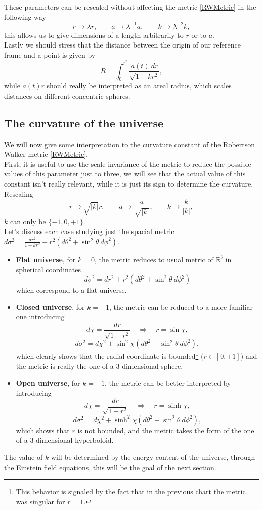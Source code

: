 These parameters can be rescaled without affecting the metric \eqref{RWMetric} in the following way
\begin{equation}
    r\rightarrow\lambda r,\qquad a\rightarrow\lambda^{-1} a,\qquad k\rightarrow\lambda^{-2} k,
\end{equation}
this allows us to give dimensions of a length arbitrarily to $r$ or to $a$.\\
Lastly we should stress that the distance between the origin of our reference frame and a point is given by
\begin{equation}
    R=\int_{0}^{r^*}\frac{a(t)\ dr}{\sqrt{1-kr^2}},
\end{equation}
while $a(t)r$ should really be interpreted as an areal radius, which scales distances on different concentric spheres. 
\subsection{The curvature of the universe}
We will now give some interpretation to the curvature constant of the Robertson Walker metric \eqref{RWMetric}.\\First, it is useful to use the scale invariance of the metric to reduce the possible values of this parameter just to three, we will see that the actual value of this constant isn't really relevant, while it is just its sign to determine the curvature. Rescaling 
\begin{equation}
    r\rightarrow\sqrt{|k|}r,\qquad a\rightarrow\frac{a}{\sqrt{|k|}},\qquad k\rightarrow\frac{k}{|k|},
\end{equation}  
$k$ can only be $\{-1,0,+1\}$. \\
Let's discuss each case studying just the spacial metric $d\sigma^2=\frac{dr^2}{1-kr^2}+r^2(d\theta^2+\sin^2\theta\ d\phi^2)$.
\begin{itemize}
    \item \textbf{Flat universe}, for $k=0$, the metric reduces to usual metric of $\mathbb{R}^3$ in spherical coordinates $$d\sigma^2= dr^2+r^2(d\theta^2+\sin^2\theta\ d\phi^2)$$ which correspond to a flat universe.
    \item \textbf{Closed universe}, for $k=+1$, the metric can be reduced to a more familiar one introducing $$d\chi=\frac{dr}{\sqrt{1-r^2}}\quad\Rightarrow\quad r=\sin\chi,$$$$d\sigma^2=d\chi^2+\sin^2\chi(d\theta^2+\sin^2\theta\ d\phi^2),$$which clearly shows that the radial coordinate is bounded\footnote{This behavior is signaled by the fact that in the previous chart the metric was singular for $r=1$.} ($r\in[0,+1]$) and the metric is really the one of a $3$-dimensional sphere.
    \item \textbf{Open universe}, for $k=-1$, the metric can be better interpreted by introducing$$d\chi=\frac{dr}{\sqrt{1+r^2}}\quad\Rightarrow\quad r=\sinh\chi,$$$$d\sigma^2=d\chi^2+\sinh^2\chi(d\theta^2+\sin^2\theta\ d\phi^2),$$ which shows that $r$ is not bounded, and the metric takes the form of the one of a $3$-dimensional hyperboloid.
\end{itemize}
The value of $k$ will be determined by the energy content of the universe, through the Einstein field equations, this will be the goal of the next section.
